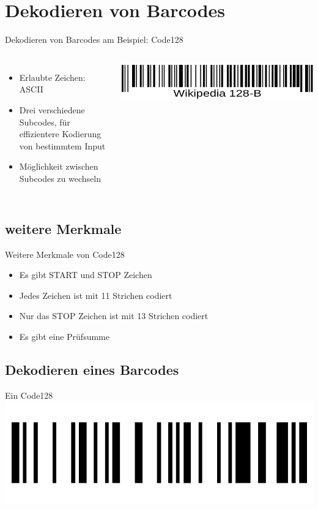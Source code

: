 \section{Dekodieren von Barcodes}
\begin{frame}{Dekodieren von Barcodes am Beispiel: Code128}
	\pause
	\begin{columns}
		\begin{itemize}
		\item Erlaubte Zeichen: ASCII
		\item Drei verschiedene Subcodes, für effizientere Kodierung von bestimmtem Input
		\item Möglichkeit zwischen Subcodes zu wechseln
		\end{itemize}
		\includegraphics[width=\textwidth]{muzy/1d-128.pdf}
	\end{columns}
\end{frame}

\subsection{weitere Merkmale}
\begin{frame}{Weitere Merkmale von Code128}
	\begin{itemize}
	\item Es gibt START und STOP Zeichen
	\item Jedes Zeichen ist mit 11 Strichen codiert
	\item Nur das STOP Zeichen ist mit 13 Strichen codiert
	\item Es gibt eine Prüfsumme
	\end{itemize}
\end{frame}

\subsection{Dekodieren eines Barcodes}
\begin{frame}{Ein Code128}
	\hfill\includegraphics[width=.95\textwidth]{muzy/cake_1.png}\hfill\hbox{}
\end{frame}

